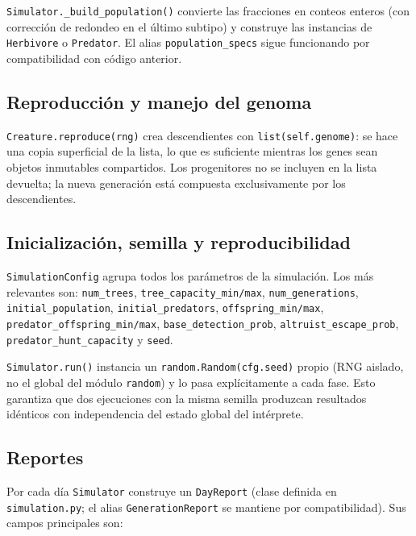 \documentclass[11pt,a4paper]{article}
\begin{document}
\texttt{Simulator.\_build\_population()} convierte las fracciones en conteos enteros (con correcci\'on
de redondeo en el \'ultimo subtipo) y construye las instancias de \texttt{Herbivore} o \texttt{Predator}.
El alias \texttt{population\_specs} sigue funcionando por compatibilidad con c\'odigo anterior.

\subsection{Reproducci\'on y manejo del genoma}

\texttt{Creature.reproduce(rng)} crea descendientes con \texttt{list(self.genome)}: se hace una copia
superficial de la lista, lo que es suficiente mientras los genes sean objetos inmutables compartidos.
Los progenitores no se incluyen en la lista devuelta; la nueva generaci\'on est\'a compuesta
exclusivamente por los descendientes.

\subsection{Inicializaci\'on, semilla y reproducibilidad}

\texttt{SimulationConfig} agrupa todos los par\'ametros de la simulaci\'on. Los m\'as relevantes son:
\texttt{num\_trees}, \texttt{tree\_capacity\_min/max}, \texttt{num\_generations},
\texttt{initial\_population}, \texttt{initial\_predators}, \texttt{offspring\_min/max},
\texttt{predator\_offspring\_min/max}, \texttt{base\_detection\_prob},
\texttt{altruist\_escape\_prob}, \texttt{predator\_hunt\_capacity} y \texttt{seed}.

\texttt{Simulator.run()} instancia un \texttt{random.Random(cfg.seed)} propio (RNG aislado, no el
global del m\'odulo \texttt{random}) y lo pasa expl\'icitamente a cada fase. Esto garantiza que
dos ejecuciones con la misma semilla produzcan resultados id\'enticos con independencia del estado
global del int\'erprete.

\subsection{Reportes}

Por cada d\'ia \texttt{Simulator} construye un \texttt{DayReport} (clase definida en
\texttt{simulation.py}; el alias \texttt{GenerationReport} se mantiene por compatibilidad).
Sus campos principales son:
\end{document}
